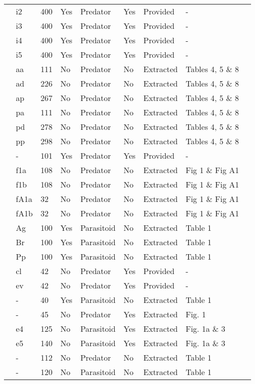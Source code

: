 \begin{longtable}{lllllllll}
\citet{Elliott:2005aa}&i2&400&Yes&Predator&Yes&Provided&-&\citet{Elliott:2020aa}\tabularnewline
\citet{Elliott:2005aa}&i3&400&Yes&Predator&Yes&Provided&-&\citet{Elliott:2020aa}\tabularnewline
\citet{Elliott:2005aa}&i4&400&Yes&Predator&Yes&Provided&-&\citet{Elliott:2020aa}\tabularnewline
\citet{Elliott:2005aa}&i5&400&Yes&Predator&Yes&Provided&-&\citet{Elliott:2020aa}\tabularnewline
\citet{Eveleigh:1982aa}&aa&111&No&Predator&No&Extracted&Tables 4, 5 \& 8&\citet{Novak:2020aa}\tabularnewline
\citet{Eveleigh:1982aa}&ad&226&No&Predator&No&Extracted&Tables 4, 5 \& 8&\citet{Novak:2020aa}\tabularnewline
\citet{Eveleigh:1982aa}&ap&267&No&Predator&No&Extracted&Tables 4, 5 \& 8&\citet{Novak:2020aa}\tabularnewline
\citet{Eveleigh:1982aa}&pa&111&No&Predator&No&Extracted&Tables 4, 5 \& 8&\citet{Novak:2020aa}\tabularnewline
\citet{Eveleigh:1982aa}&pd&278&No&Predator&No&Extracted&Tables 4, 5 \& 8&\citet{Novak:2020aa}\tabularnewline
\citet{Eveleigh:1982aa}&pp&298&No&Predator&No&Extracted&Tables 4, 5 \& 8&\citet{Novak:2020aa}\tabularnewline
\citet{Fussmann:2005aa}&-&101&Yes&Predator&Yes&Provided&-&\citet{Fussmann:2020aa}\tabularnewline
\citet{Griffen:2007aa}&f1a&108&No&Predator&No&Extracted&Fig 1 \& Fig A1&\citet{Novak:2020aa}\tabularnewline
\citet{Griffen:2007aa}&f1b&108&No&Predator&No&Extracted&Fig 1 \& Fig A1&\citet{Novak:2020aa}\tabularnewline
\citet{Griffen:2007aa}&fA1a&32&No&Predator&No&Extracted&Fig 1 \& Fig A1&\citet{Novak:2020aa}\tabularnewline
\citet{Griffen:2007aa}&fA1b&32&No&Predator&No&Extracted&Fig 1 \& Fig A1&\citet{Novak:2020aa}\tabularnewline
\citet{Hassan:1976aa}&Ag&100&Yes&Parasitoid&No&Extracted&Table 1&\citet{Novak:2020aa}\tabularnewline
\citet{Hassan:1976aa}&Br&100&Yes&Parasitoid&No&Extracted&Table 1&\citet{Novak:2020aa}\tabularnewline
\citet{Hassan:1976aa}&Pp&100&Yes&Parasitoid&No&Extracted&Table 1&\citet{Novak:2020aa}\tabularnewline
\citet{Hossie:2016aa}&cl&42&No&Predator&Yes&Provided&-&\citet{Hossie:2020aa}\tabularnewline
\citet{Hossie:2016aa}&ev&42&No&Predator&Yes&Provided&-&\citet{Hossie:2020aa}\tabularnewline
\citet{Huffaker:1982aa}&-&40&Yes&Parasitoid&No&Extracted&Table 1&\citet{Novak:2020aa}\tabularnewline
\citet{Johnson:2006aa}&-&45&No&Predator&Yes&Extracted&Fig. 1&\citet{Novak:2020aa}\tabularnewline
\citet{Jones:1988aa, Jones:1986aa}&e4&125&No&Parasitoid&Yes&Extracted&Fig. 1a \& 3&\citet{Novak:2020aa}\tabularnewline
\citet{Jones:1988aa, Jones:1986aa}&e5&140&No&Parasitoid&Yes&Extracted&Fig. 1a \& 3&\citet{Novak:2020aa}\tabularnewline
\citet{Katz:1985ai}&-&112&No&Predator&No&Extracted&Table 1&\citet{Arditi:1990sp}\tabularnewline
\citet{Kfir:1983aa}&-&120&No&Parasitoid&No&Extracted&Table 1&\citet{Novak:2020aa}\tabularnewline

\end{longtable}
